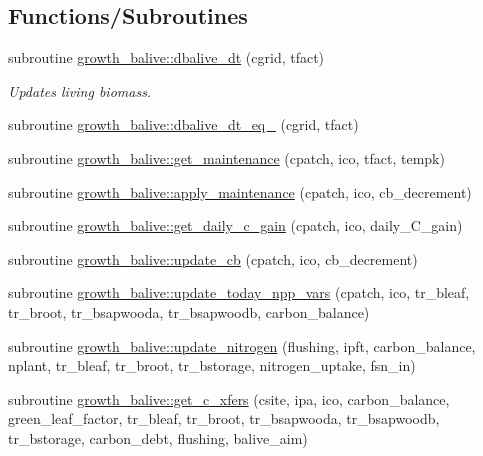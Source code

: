 \subsection*{Functions/\+Subroutines}
\begin{DoxyCompactItemize}
\item 
subroutine \hyperlink{namespacegrowth__balive_a7781ae229b2399c90d50858382665ee8}{growth\+\_\+balive\+::dbalive\+\_\+dt} (cgrid, tfact)
\begin{DoxyCompactList}\small\item\em Updates living biomass. \end{DoxyCompactList}\item 
subroutine \hyperlink{namespacegrowth__balive_a15cba39e9b70b8dd6a1e2d0cbdd5cc2e}{growth\+\_\+balive\+::dbalive\+\_\+dt\+\_\+eq\+\_} (cgrid, tfact)
\item 
subroutine \hyperlink{namespacegrowth__balive_ac2f667372e6f2a5fc7329466cc958a6c}{growth\+\_\+balive\+::get\+\_\+maintenance} (cpatch, ico, tfact, tempk)
\item 
subroutine \hyperlink{namespacegrowth__balive_a861b85f31215415551f4a9c03302ff6e}{growth\+\_\+balive\+::apply\+\_\+maintenance} (cpatch, ico, cb\+\_\+decrement)
\item 
subroutine \hyperlink{namespacegrowth__balive_ad43c7e3fcb88db17077ed58aeab8fe2d}{growth\+\_\+balive\+::get\+\_\+daily\+\_\+c\+\_\+gain} (cpatch, ico, daily\+\_\+\+C\+\_\+gain)
\item 
subroutine \hyperlink{namespacegrowth__balive_ac4ca7901eed6321044f171f6f1b8d7d6}{growth\+\_\+balive\+::update\+\_\+cb} (cpatch, ico, cb\+\_\+decrement)
\item 
subroutine \hyperlink{namespacegrowth__balive_a6c0ddec560e65b6d58be7041bd8dade2}{growth\+\_\+balive\+::update\+\_\+today\+\_\+npp\+\_\+vars} (cpatch, ico, tr\+\_\+bleaf, tr\+\_\+broot, tr\+\_\+bsapwooda, tr\+\_\+bsapwoodb, carbon\+\_\+balance)
\item 
subroutine \hyperlink{namespacegrowth__balive_a8599682ade194a107377a540d7e64c73}{growth\+\_\+balive\+::update\+\_\+nitrogen} (flushing, ipft, carbon\+\_\+balance, nplant, tr\+\_\+bleaf, tr\+\_\+broot, tr\+\_\+bstorage, nitrogen\+\_\+uptake, fsn\+\_\+in)
\item 
subroutine \hyperlink{namespacegrowth__balive_a4a738e1e648a3932ae0beb2400c9bf78}{growth\+\_\+balive\+::get\+\_\+c\+\_\+xfers} (csite, ipa, ico, carbon\+\_\+balance, green\+\_\+leaf\+\_\+factor, tr\+\_\+bleaf, tr\+\_\+broot, tr\+\_\+bsapwooda, tr\+\_\+bsapwoodb, tr\+\_\+bstorage, carbon\+\_\+debt, flushing, balive\+\_\+aim)

\end{DoxyCompactItemize}
